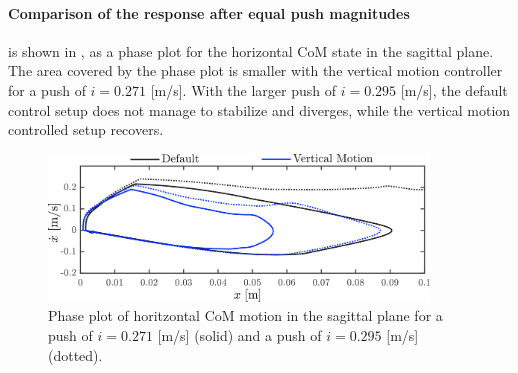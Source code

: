 \paragraph{Comparison of the response after equal push magnitudes} is shown in , as a phase plot for the horizontal \ac{CoM} state in the sagittal plane. The area covered by the phase plot is smaller with the vertical motion controller for a push of $i=0.271$ [m/s]. With the larger push of $i=0.295$ [m/s], the default control setup does not manage to stabilize and diverges, while the vertical motion controlled setup recovers.
\begin{figure}
\centering
\includegraphics[width=0.9\textwidth]{STYLESTUFF/valcomparephase.png}
\caption{Phase plot of horitzontal \ac{CoM} motion in the sagittal plane for a push of $i=0.271$ [m/s] (solid) and a push of $i=0.295$ [m/s] (dotted).}
\label{fig:valcomparephase}
\end{figure}

